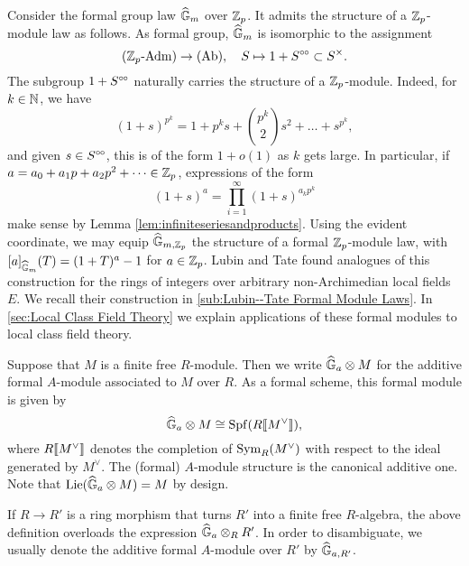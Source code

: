 \documentclass[../main.tex]{subfiles}
\begin{document}
\begin{xpl}
  Consider the formal group law $\widehat{\mathbb{G}}_m$ over $\mathbb{Z}_p$. It 
  admits the structure of a $\mathbb{Z}_p$-module law as follows. 
  As formal group, $\widehat{\mathbb{G}}_m$ is isomorphic to the assignment
  \begin{equation*}
    {({\mathbb{Z}_p}\textnormal-\allowbreak\mathrm{Adm})} \to {(\mathrm{Ab})}, \quad S \mapsto 1 + S^{\circ \hspace{-0.5pt} \circ} \subset S^\times.
  \end{equation*}
  The subgroup $1 + S^{\circ \hspace{-0.5pt} \circ}$ naturally carries the structure of a $\mathbb{Z}_p$-module.
  Indeed, for $k \in \mathbb{N}$, we have
  \begin{equation*}
    (1+s)^{p^k} = 1 + p^ks + \binom{p^k}2 s^2 + \dots + s^{p^k},
  \end{equation*}
  and given $s \in S^{\circ \hspace{-0.5pt} \circ}$, this is of the form $1+ o(1)$ as $k$ gets large. 
  In particular, if $a = a_0 + a_1 p + a_2p^2 + \dots \in \mathbb{Z}_p$, expressions of  the form
  \begin{equation*}
    (1+s)^a = \prod_{i = 1}^\infty (1+s)^{a_k p^k}
  \end{equation*}
  make sense by Lemma \ref{lem:infiniteseriesandproducts}. 
  Using the evident coordinate, we may equip
  $\widehat{\mathbb{G}}_{m,\mathbb{Z}_p}$ the structure of a formal $\mathbb{Z}_p$-module law, with
  $[a]_{\widehat{\mathbb{G}}_m}(T) = (1+T)^a -1$ for $a \in \mathbb{Z}_p$. 
  Lubin and Tate found analogues of this construction for the rings of integers 
  over arbitrary non-Archimedian local fields $E$. We recall their construction in 
  \cref{sub:Lubin--Tate Formal Module Laws}. In  \cref{sec:Local Class
  Field Theory} we explain applications of these formal modules to local class
  field theory.
\end{xpl}





\begin{defi}
  \label{def:additiveformalmoduleassociatedtomodule}
  Suppose that $M$ is a finite free $R$-module. Then we write
  $\widehat{\mathbb{G}}_a \otimes M$ for the additive formal $A$-module associated to $M$ over $R$.
  As a formal scheme, this formal module is given by
  \begin{equation*}
    \widehat{\mathbb{G}}_a \otimes M \cong \operatorname{Spf}(R \llbracket M^\vee \rrbracket),
  \end{equation*}
  where $R \llbracket M^\vee \rrbracket$ denotes the completion of $\operatorname{Sym}_R(M^\vee)$ with respect
  to the ideal generated by $M^\vee$. The (formal) $A$-module structure is the
  canonical additive one. 
  Note that $\operatorname{Lie}(\widehat{\mathbb{G}}_a \otimes M) = M$ by design. 
  \end{defi}
\begin{rmk} 
  If $R\to R'$ is a ring morphism that turns $R'$ into a finite free
  $R$-algebra, the above definition overloads the expression $\widehat{\mathbb{G}}_a \otimes_R R'$.
  In order to disambiguate, we usually denote the additive formal $A$-module
  over $R'$ by $\widehat{\mathbb{G}}_{a, R'}$. 
\end{rmk}
\end{document}

